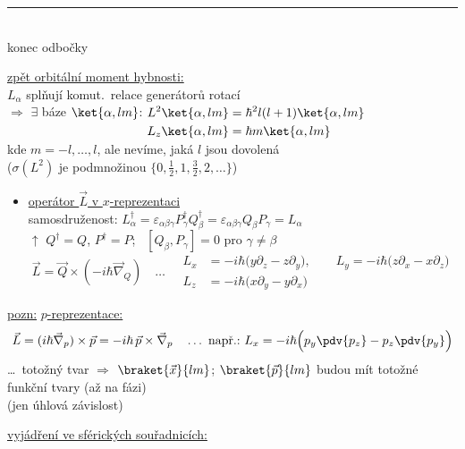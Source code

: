 {\color{teal}\rule{\linewidth}{0.8pt}}\\[-4pt]
\hfill{\color{teal}konec odbočky}

\underline{zpět orbitální moment hybnosti:} \\
\quad $L_\alpha$ splňují komut.\ relace generátorů rotací \\
\quad $\Rightarrow$ $\exists$ báze $\ket{\alpha,lm}$: \quad
$\begin{aligned}[t] L^2\ket{\alpha,lm} &= \hbar^2 l(l+1)\ket{\alpha,lm} \\ L_z\ket{\alpha,lm} &= \hbar m\ket{\alpha,lm}\end{aligned}$ \\
\quad kde $m = -l,\dots,l$, ale nevíme, jaká $l$ jsou dovolená \\
\quad ($\sigma(L^2)$ je podmnožinou $\{0,\frac12,1,\frac32,2,\dots\}$)

\begin{itemize}
  \item \underline{operátor $\vec L$ v $x$-reprezentaci} \\
  samosdruženost: \quad $L_\alpha^\dagger = \varepsilon_{\alpha\beta\gamma}P_\gamma^\dagger Q_\beta^\dagger = \varepsilon_{\alpha\beta\gamma}Q_\beta P_\gamma = L_\alpha$ \\
  \hspace*{5cm} $\uparrow$ $Q^\dagger = Q$, $P^\dagger = P$; \ $[Q_\beta,P_\gamma] = 0$ pro $\gamma\neq\beta$
  \[
    \vec L = \vec Q\times(-i\hbar\vec\nabla_Q) \quad\dots\quad
    \begin{aligned}
      L_x &= -i\hbar\big(y\partial_z - z\partial_y\big), \qquad L_y = -i\hbar\big(z\partial_x - x\partial_z\big) \\
      L_z &= -i\hbar\big(x\partial_y - y\partial_x\big)
    \end{aligned}
  \]
\end{itemize}

\underline{pozn:} \underline{$p$-reprezentace:}
\[
  \vec L = (i\hbar\vec\nabla_p)\times\vec p = -i\hbar\,\vec p\times\vec\nabla_p
  \quad\dots\ \text{např.:}\ L_x = -i\hbar\Big(p_y\pdv{p_z} - p_z\pdv{p_y}\Big)
\]
\dots\ totožný tvar $\Rightarrow$ $\braket{\vec x}{lm}$; $\braket{\vec p}{lm}$ budou mít totožné funkční tvary (až na fázi) \\
\hspace*{2cm} (jen úhlová závislost)

\underline{vyjádření ve sférických souřadnicích:}

